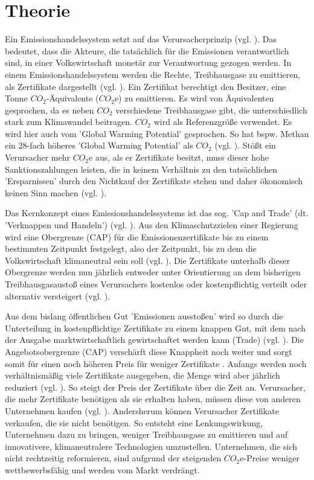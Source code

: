 \chapter{Theorie}

Ein Emissionshandelssystem setzt auf das Verursacherprinzip (vgl. \cite[S. 161]{hubert.2020}).
Das bedeutet, dass die Akteure, die tatsächlich für die Emissionen verantwortlich sind, in einer Volkswirtschaft monetär zur Verantwortung gezogen werden.
In einem Emissionshandelssystem werden die Rechte, Treibhausgase zu emittieren, als Zertifikate dargestellt (vgl. \cite[S. 27]{rabe.2018}).
Ein Zertifikat berechtigt den Besitzer, eine Tonne $CO_2$-Äquivalente ($CO_2$e) zu emittieren.
Es wird von Äquivalenten gesprochen, da es neben $CO_2$ verschiedene Treibhausgase gibt, die unterschiedlich stark zum Klimawandel beitragen. $CO_2$ wird als Referenzgröße verwendet.
Es wird hier auch vom 'Global Warming Potential' gesprochen. So hat bspw. Methan ein 28-fach höheres 'Global Warming Potential' als $CO_2$ (vgl. \cite{ub.2023}).
Stößt ein Verursacher mehr $CO_2$e aus, als er Zertifikate besitzt, muss dieser hohe Sanktionszahlungen leisten, die in keinem Verhältnis zu den tatsächlichen 'Ersparnissen' durch den Nichtkauf der Zertifikate stehen und daher ökonomisch keinen Sinn machen (vgl. \cite[S. 181]{hubert.2020}).

Das Kernkonzept eines Emissionshandelssystems ist das sog. 'Cap and Trade' (dt. 'Verknappen und Handeln') (vgl. \cite[S. 134]{rabe.2018}).
Aus den Klimaschutzzielen einer Regierung wird eine Obergrenze (CAP) für die Emissionenzertifikate bis zu einem bestimmten Zeitpunkt festgelegt, also der Zeitpunkt, bis zu dem die Volkswirtschaft klimaneutral sein soll (vgl. \cite[S. 181]{hubert.2020}).
Die Zertifikate unterhalb dieser Obergrenze werden nun jährlich entweder unter Orientierung an dem bisherigen Treibhausgasaustoß eines Verursachers kostenlos oder kostenpflichtig verteilt oder alternativ versteigert (vgl. \cite[S. 181]{hubert.2020}).

Aus dem bislang öffentlichen Gut 'Emissionen ausstoßen' wird so durch die Unterteilung in kostenpflichtige Zertifikate zu einem knappen Gut, mit dem nach der Ausgabe marktwirtschaftlich gewirtschaftet werden kann (Trade) (vgl. \cite[S. 17]{hubert.2020}).
Die Angebotsobergrenze (CAP) verschärft diese Knappheit noch weiter und sorgt somit für einen noch höheren Preis für weniger Zertifikate .
Anfangs werden noch verhältnismäßig viele Zertifikate ausgegeben, die Menge wird aber jährlich reduziert (vgl. \cite[S. 182]{hubert.2020}). So steigt der Preis der Zertifikate über die Zeit an.
Verursacher, die mehr Zertifikate benötigen als sie erhalten haben, müssen diese von anderen Unternehmen kaufen (vgl. \cite[S. 182]{hubert.2020}).
Andersherum können Verursacher Zertifikate verkaufen, die sie nicht benötigen.
So entsteht eine Lenkungswirkung, Unternehmen dazu zu bringen, weniger Treibhausgase zu emittieren und auf innovativere, klimaneutralere Technologien umzustellen.
Unternehmen, die sich nicht rechtzeitig reformieren, sind aufgrund der steigenden $CO_2$e-Preise weniger wettbewerbsfähig und werden vom Markt verdrängt.